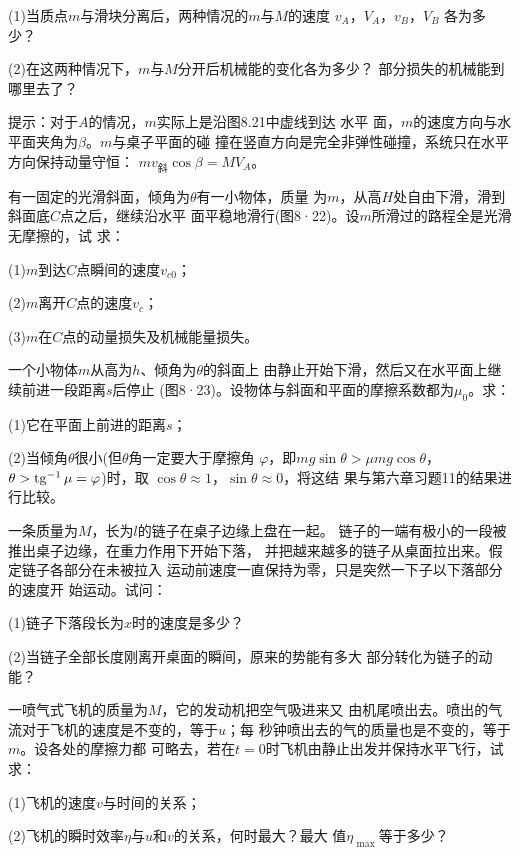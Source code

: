 \begin{exercises}
(1)当质点$ m $与滑块分离后，两种情况的$ m $与$ M $的速度
$ v _ { A } $，$ V _ { A } $，$ v _ { B } $，$ V _ { B } $
各为多少？

(2)在这两种情况下，$ m $与$ M $分开后机械能的变化各为多少？
部分损失的机械能到哪里去了？

\lhbrak 提示：对于$ A $的情况，$ m $实际上是沿图8.21中虚线到达
水平
面，$ m $的速度方向与水平面夹角为$ \beta $。$ m $与桌子平面的碰
撞在竖直方向是完全非弹性碰撞，系统只在水平方向保持动量守恒：
$ m v _ \text {斜} \cos \beta = M V _ { A }$。\rhbrak

\exercise 有一固定的光滑斜面，倾角为$ \theta $有一小物体，质量
为$ m $，从高$ H $处自由下滑，滑到斜面底$ C $点之后，继续沿水平
面平稳地滑行(图8·22)。设$ m $所滑过的路程全是光滑无摩擦的，试
求：

(1)\;$ m $到达$ C $点瞬间的速度$ v _ { c 0 } $；

(2)\;$ m $离开$ C $点的速度$ v _ { c } $；

(3)\;$ m $在$ C $点的动量损失及机械能量损失。

\exercise 一个小物体$ m $从高为$ h $、倾角为$ \theta $的斜面上
由静止开始下滑，然后又在水平面上继续前进一段距离$ s $后停止
(图8·23)。设物体与斜面和平面的摩擦系数都为$ \mu _ { 0 } $。求：

(1)它在平面上前进的距离$ s $；

(2)当倾角$ \theta $很小(但$ \theta $角一定要大于摩擦角
$ \varphi $，即$ m g \sin \theta > \mu m g \cos \theta $，
$ \theta > \operatorname{tg} ^ { -1 } \mu = \varphi $)时，取
$ \cos \theta \approx 1 $，$\sin \theta \approx 0 $，将这结
果与第六章习题11的结果进行比较。

\exercise 一条质量为$ M $，长为$ l $的链子在桌子边缘上盘在一起。
链子的一端有极小的一段被推出桌子边缘，在重力作用下开始下落，
并把越来越多的链子从桌面拉出来。假定链子各部分在未被拉入
运动前速度一直保持为零，只是突然一下子以下落部分的速度开
始运动。试问：

(1)链子下落段长为$ x $时的速度是多少？

(2)当链子全部长度刚离开桌面的瞬间，原来的势能有多大
部分转化为链子的动能？

\exercise 一喷气式飞机的质量为$ M $，它的发动机把空气吸进来又
由机尾喷出去。喷出的气流对于飞机的速度是不变的，等于$ u $；每
秒钟喷出去的气的质量也是不变的，等于$ m $。设各处的摩擦力都
可略去，若在$ t = 0 $时飞机由静止出发并保持水平飞行，试求：

(1)飞机的速度$ v $与时间的关系；

(2)飞机的瞬时效率$ \eta $与$ u $和$ v $的关系，何时最大？最大
值$ \eta _ { \text { max } } $等于多少？

\end{exercises}